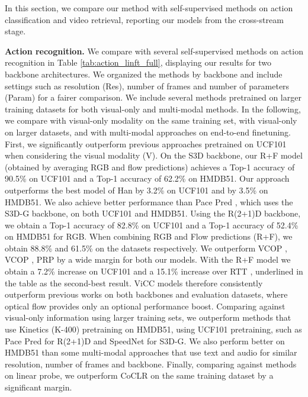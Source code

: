 \documentclass[10pt,twocolumn,letterpaper]{article}
\begin{document}
In this section, we compare our method with self-supervised methods on action classification and video retrieval, reporting our models from the cross-stream stage.

\textbf{Action recognition.} We compare with several self-supervised methods on action recognition in Table \ref{tab:action_linft_full}, displaying our results for two backbone architectures. We organized the methods by backbone and include settings such as resolution (Res), number of frames and number of parameters (Param) for a fairer comparison. We include several methods pretrained on larger training datasets for both visual-only and multi-modal methods. In the following, we compare with visual-only modality on the same training set, with visual-only on larger datasets, and with multi-modal approaches on end-to-end finetuning. First, we significantly outperform previous approaches pretrained on UCF101 when considering the visual modality (V). On the S3D backbone, our R+F model (obtained by averaging RGB and flow predictions) achieves a Top-1 accuracy of 90.5\% on UCF101 and a Top-1 accuracy of 62.2\% on HMDB51. Our approach outperforms the best model of Han \etal \cite{han_self-supervised_2020} by 3.2\% on UCF101 and by 3.5\% on HMDB51. We also achieve better performance than Pace Pred \cite{wang_self-supervised_2020}, which uses the S3D-G \cite{xie_rethinking_2018} backbone, on both UCF101 and HMDB51. Using the R(2+1)D backbone, we obtain a Top-1 accuracy of 82.8\% on UCF101 and a Top-1 accuracy of 52.4\% on HMDB51 for RGB. When combining RGB and Flow predictions (R+F), we obtain 88.8\% and 61.5\% on the datasets respectively. We outperform VCOP \cite{luo_exploring_2020}, VCOP \cite{xu_self-supervised_2019}, PRP \cite{yao_video_2020} by a wide margin for both our models. With the R+F model we obtain a 7.2\% increase on UCF101 and a 15.1\% increase over RTT \cite{jenni_video_2020}, underlined in the table as the second-best result. ViCC models therefore consistently outperform previous works on both backbones and evaluation datasets, where optical flow provides only an optional performance boost. Comparing against visual-only information using larger training sets, we outperform methods that use Kinetics (K-400) pretraining on HMDB51, using UCF101 pretraining, such as Pace Pred \cite{wang_self-supervised_2019} for R(2+1)D and SpeedNet \cite{benaim_speednet_2020} for S3D-G. We also perform better on HMDB51 than some multi-modal approaches that use text \cite{miech_end--end_2020} and audio \cite{asano_self-labelling_2020} for similar resolution, number of frames and backbone. Finally, comparing against methods on linear probe, we outperform CoCLR \cite{han_self-supervised_2020} on the same training dataset by a significant margin. 
\end{document}
